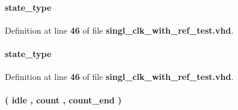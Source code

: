 \paragraph[{current\+\_\+state}]{ {\bfseries {\bfseries {\bf state\+\_\+type}} \textcolor{vhdlchar}{ }} \hspace{0.3cm}{\ttfamily [Signal]}}\label{classsingl__clk__with__ref__test_1_1arch_a7ede5b91aac1f3d1b2a884a5e191d554}


Definition at line {\bf 46} of file {\bf singl\+\_\+clk\+\_\+with\+\_\+ref\+\_\+test.\+vhd}.

\paragraph[{next\+\_\+state}]{ {\bfseries {\bfseries {\bf state\+\_\+type}} \textcolor{vhdlchar}{ }} \hspace{0.3cm}{\ttfamily [Signal]}}\label{classsingl__clk__with__ref__test_1_1arch_a7b92f98d060e763f3dd6fa727ddb03d8}


Definition at line {\bf 46} of file {\bf singl\+\_\+clk\+\_\+with\+\_\+ref\+\_\+test.\+vhd}.

\paragraph[{state\+\_\+type}]{ {\bfseries \textcolor{vhdlchar}{(}\textcolor{vhdlchar}{ }\textcolor{vhdlchar}{idle}\textcolor{vhdlchar}{ }\textcolor{vhdlchar}{,}\textcolor{vhdlchar}{ }\textcolor{vhdlchar}{count}\textcolor{vhdlchar}{ }\textcolor{vhdlchar}{,}\textcolor{vhdlchar}{ }\textcolor{vhdlchar}{count\+\_\+end}\textcolor{vhdlchar}{ }\textcolor{vhdlchar}{)}\textcolor{vhdlchar}{ }} \hspace{0.3cm}{\ttfamily [Type]}}\label{classsingl__clk__with__ref__test_1_1arch_a5d63eac905ea5dbf6baaf64e5d8569d5}


